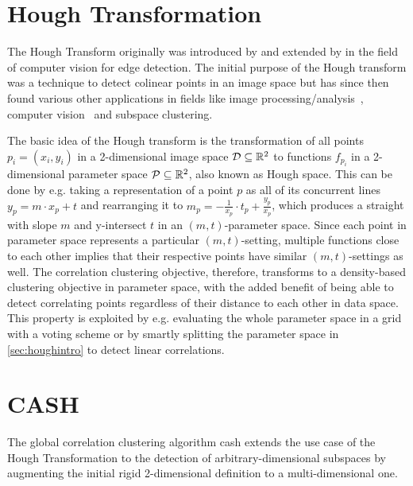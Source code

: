 
\section{Hough Transformation}\label{sec:houghintro}
The Hough Transform originally was introduced by \textcite{houghOriginal1962method} and extended by \textcite{rosenfeld1969picture} in the field of computer vision for edge detection\cite{houghhistoryhart2009hough}. The initial purpose of the Hough transform was a technique to detect colinear points in an image space but has since then found various other applications in fields like image processing/analysis~\cite{rosenfeld1969picture,ballard1981generalizing}, computer vision~\cite{davies2004machine} and subspace clustering\cite{CASHachtert2008robust}.

The basic idea of the Hough transform is the transformation of all points $p_i = (x_i,y_i)$ in a 2-dimensional image space $\mathcal{D} \subseteq \mathbb{R}^2$ to functions $f_{p_i}$ in a 2-dimensional parameter space $\mathcal{P} \subseteq \mathbb{R}^2$, also known as Hough space\cite{illingworth1988survey}. This can be done by e.g. taking a representation of a point $p$ as all of its concurrent lines $y_p = m \cdot x_p + t$ and rearranging it to $m_{p} = - \frac{1}{x_p} \cdot t_{p} + \frac{y_p}{x_p}$, which produces a straight with slope $m$ and y-intersect $t$ in an $(m,t)$-parameter space. Since each point in parameter space represents a particular $(m,t)$-setting, multiple functions close to each other implies that their respective points have similar $(m,t)$-settings as well. The correlation clustering objective, therefore, transforms to a density-based clustering objective in parameter space, with the added benefit of being able to detect correlating points regardless of their distance to each other in data space. This property is exploited by e.g. evaluating the whole parameter space in a grid with a voting scheme or by smartly splitting the parameter space in \autoref{sec:houghintro} to detect linear correlations. 

\section{CASH}\label{sec:cashintro}
The global correlation clustering algorithm \gls{cash} extends the use case of the Hough Transformation to the detection of arbitrary-dimensional subspaces by augmenting the initial rigid 2-dimensional definition to a multi-dimensional one. 

